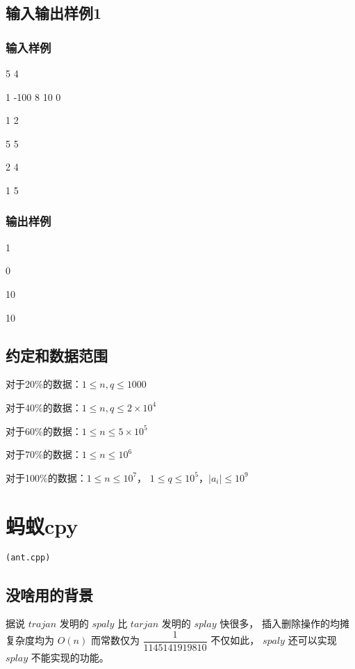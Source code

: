 \documentclass[UTF8]{ctexart}
\begin{document}
\subsection{输入输出样例1}

\subsubsection{输入样例}

5 4

1 -100 8 10 0

1 2

5 5

2 4

1 5

\subsubsection{输出样例}

1

0

10

10

\subsection{约定和数据范围}

对于20\%的数据：$1\le n,q \le 1000$

对于40\%的数据：$1\le n,q \le 2\times 10^4$

对于60\%的数据：$1\le n \le 5\times 10^5$

对于70\%的数据：$1\le n \le 10^6$

对于100\%的数据：$1 \le n \le 10^7$， $1\le q\le 10^5$，$|a_i| \le 10^9$

\newpage
\section{蚂蚁cpy}
\begin{center}
\tt\large{(ant.cpp)}
\end{center}

\subsection{没啥用的背景}

据说 $trajan$ 发明的 $spaly$ 比 $tarjan$ 发明的 $splay$ 快很多， 插入删除操作的均摊复杂度均为 $O(n)$ 而常数仅为 $\dfrac{1}{1145141919810}$ 不仅如此， $spaly$ 还可以实现 $splay$ 不能实现的功能。
\end{document}
